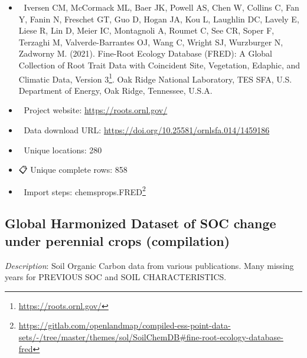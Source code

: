\documentclass[
  graybox,natbib,nospthms]{svmono}
\providecommand{\tightlist}{%
  \setlength{\itemsep}{0pt}\setlength{\parskip}{0pt}}
\providecommand{\tightlist}{\setlength{\itemsep}{0pt}\setlength{\parskip}{0pt}}
\renewcommand{\href}[2]{#2 (\url{#1})}
\renewcommand{\href}[2]{#2\footnote{\url{#1}}}
\begin{document}
\begin{itemize}
\tightlist
\item
  📕 Iversen CM, McCormack ML, Baer JK, Powell AS, Chen W, Collins C, Fan Y, Fanin N, Freschet GT, Guo D, Hogan JA, Kou L, Laughlin DC, Lavely E, Liese R, Lin D, Meier IC, Montagnoli A, Roumet C, See CR, Soper F, Terzaghi M, Valverde-Barrantes OJ, Wang C, Wright SJ, Wurzburger N, Zadworny M. (2021). \href{https://roots.ornl.gov/}{Fine-Root Ecology Database (FRED): A Global Collection of Root Trait Data with Coincident Site, Vegetation, Edaphic, and Climatic Data, Version 3}. Oak Ridge National Laboratory, TES SFA, U.S. Department of Energy, Oak Ridge, Tennessee, U.S.A.\\
\item
  🔗 Project website: \url{https://roots.ornl.gov/}\\
\item
  📂 Data download URL: \url{https://doi.org/10.25581/ornlsfa.014/1459186}\\
\item
  📍 Unique locations: 280\\
\item
  📋 Unique complete rows: 858\\
\item
  📝 Import steps: \href{https://gitlab.com/openlandmap/compiled-ess-point-data-sets/-/tree/master/themes/sol/SoilChemDB\#fine-root-ecology-database-fred}{chemsprops.FRED}
\end{itemize}

\hypertarget{global-harmonized-dataset-of-soc-change-under-perennial-crops-compilation}{%
\subsection{Global Harmonized Dataset of SOC change under perennial crops (compilation)}\label{global-harmonized-dataset-of-soc-change-under-perennial-crops-compilation}}

\emph{Description}: Soil Organic Carbon data from various publications. Many missing
years for PREVIOUS SOC and SOIL CHARACTERISTICS.
\end{document}
